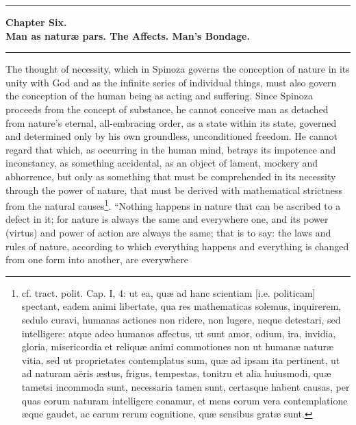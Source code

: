 \documentclass[12pt,a4paper,openany]{book}
\newcommand{\opage}[1]{\marginnote{\footnotesize\textit{[#1]}}}
\begin{document}
\bigskip
\begin{center}\rule{2.5cm}{0.4pt}\end{center}
\bigskip

\begin{center}
{\large\textbf{Chapter Six.}}\\[4pt]
\textbf{Man as naturæ pars. The Affects. Man's
Bondage.}\\[6pt]
\rule{2cm}{0.4pt}
\end{center}
\bigskip

The thought of necessity, which in Spinoza governs
the conception of nature in its unity with God and as the
infinite series of individual things, must also govern
\opage{109}\setcounter{footnote}{0}the conception of the human being as acting and
suffering. Since Spinoza proceeds from the concept of substance,
he cannot conceive man as detached from nature's
eternal, all-embracing order, as a state within its state, governed
and determined only by his own groundless, unconditioned freedom.
He cannot regard that which, as occurring in the
human mind, betrays its impotence and inconstancy,
as something accidental, as an object of lament,
mockery and abhorrence, but only as something that must be comprehended in
its necessity through the power of nature, that must be derived with mathematical
strictness from the natural
causes\footnote{cf. tract. polit. Cap. I, 4: ut ea, quæ ad
hanc scientiam [i.e. politicam] spectant, eadem animi libertate,
qua res mathematicas solemus, inquirerem, sedulo curavi,
humanas actiones non ridere, non lugere, neque detestari, sed
intelligere: atque adeo humanos affectus, ut sunt amor, odium,
ira, invidia, gloria, misericordia et reliquæ animi
commotiones non ut humanæ naturæ vitia, sed ut proprietates
contemplatus sum, quæ ad ipsam ita pertinent, ut ad naturam
aëris æstus, frigus, tempestas, tonitru et alia huiusmodi, quæ
tametsi incommoda sunt, necessaria tamen sunt, certasque
habent causas, per quas eorum naturam intelligere conamur, et
mens eorum vera contemplatione æque gaudet, ac earum rerum
cognitione, quæ sensibus gratæ sunt.}. ``Nothing happens
in nature that can be ascribed to a defect in it;
for nature is always the same and everywhere one, and
its power (virtus) and power of action are always the same;
that is to say: the laws and rules of nature, according to which everything
happens and everything is changed from one form into another, are everywhere
\end{document}
